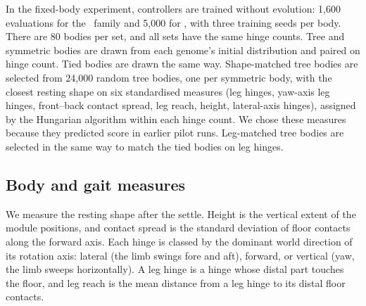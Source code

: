 In the fixed-body experiment, controllers are trained without evolution: 1{,}600 evaluations for the \bb\ family and 5{,}000 for \dann, with three training seeds per body. There are 80 bodies per set, and all sets have the same hinge counts. Tree and symmetric bodies are drawn from each genome's initial distribution and paired on hinge count. Tied bodies are drawn the same way. Shape-matched tree bodies are selected from 24{,}000 random tree bodies, one per symmetric body, with the closest resting shape on six standardised measures (leg hinges, yaw-axis leg hinges, front--back contact spread, leg reach, height, lateral-axis hinges), assigned by the Hungarian algorithm within each hinge count. We chose these measures because they predicted score in earlier pilot runs. Leg-matched tree bodies are selected in the same way to match the tied bodies on leg hinges.

\begin{table}[t]
  \centering
  \small
  \caption{Experiments. Evaluations are controller evaluations per body.}
  \label{tab:experiments}
\end{table}

\subsection{Body and gait measures}
\label{sec:measures}

We measure the resting shape after the settle. Height is the vertical extent of the module positions, and contact spread is the standard deviation of floor contacts along the forward axis. Each hinge is classed by the dominant world direction of its rotation axis: lateral (the limb swings fore and aft), forward, or vertical (yaw, the limb sweeps horizontally). A leg hinge is a hinge whose distal part touches the floor, and leg reach is the mean distance from a leg hinge to its distal floor contacts.

